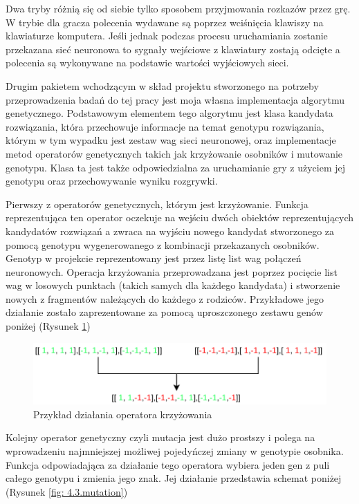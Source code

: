 \documentclass[12pt, oneside, a4paper]{report}
\begin{document}
Dwa tryby różnią się od siebie tylko sposobem przyjmowania rozkazów przez grę. W trybie dla gracza polecenia wydawane są poprzez wciśnięcia klawiszy na klawiaturze komputera. Jeśli jednak podczas procesu uruchamiania zostanie przekazana sieć neuronowa to sygnały wejściowe z klawiatury zostają odcięte a polecenia są wykonywane na podstawie wartości wyjściowych sieci.

Drugim pakietem wchodzącym w skład projektu stworzonego na potrzeby przeprowadzenia badań do tej pracy jest moja własna implementacja algorytmu genetycznego. Podstawowym elementem tego algorytmu jest klasa kandydata rozwiązania, która przechowuje informacje na temat genotypu rozwiązania, którym w tym wypadku jest zestaw wag sieci neuronowej, oraz implementacje metod operatorów genetycznych takich jak krzyżowanie osobników i mutowanie genotypu. Klasa ta jest także odpowiedzialna za uruchamianie gry z użyciem jej genotypu oraz przechowywanie wyniku rozgrywki.

Pierwszy z operatorów genetycznych, którym jest krzyżowanie. Funkcja reprezentująca ten operator oczekuje na wejściu dwóch obiektów reprezentujących kandydatów rozwiązań a zwraca na wyjściu nowego kandydat stworzonego za pomocą genotypu wygenerowanego z kombinacji przekazanych osobników. Genotyp w projekcie reprezentowany jest przez listę list wag połączeń neuronowych. Operacja krzyżowania przeprowadzana jest poprzez pocięcie list wag w losowych punktach (takich samych dla każdego kandydata) i stworzenie nowych z fragmentów należących do każdego z rodziców. Przykładowe jego działanie zostało zaprezentowane za pomocą uproszczonego zestawu genów poniżej (Rysunek \ref{fig: 4.3.crossing})

\begin{figure}[h]
	\centering
	\includegraphics[width=14cm]{fig431.png}
	\caption{Przykład działania operatora krzyżowania}
	\label{fig: 4.3.crossing}
\end{figure}
\newpage

Kolejny operator genetyczny czyli mutacja jest dużo prostszy i polega na wprowadzeniu najmniejszej możliwej pojedyńczej zmiany w genotypie osobnika. Funkcja odpowiadająca za działanie tego operatora wybiera jeden gen z puli całego genotypu i zmienia jego znak. Jej działanie przedstawia schemat poniżej (Rysunek \ref{fig: 4.3.mutation})
\end{document}

